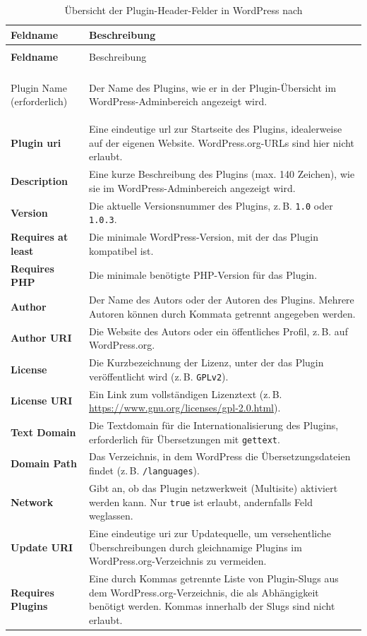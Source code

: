 \begin{longtable}{>{\bfseries}p{4cm} p{10cm}}
 \caption{Übersicht der Plugin-Header-Felder in WordPress nach \cite{wordpress2024HeaderRequirement}} \\
 \hline
 Feldname & Beschreibung \\
 \hline
 \endfirsthead

 \multicolumn{2}{l}{\textit{Fortsetzung von vorheriger Seite}} \\
 \hline
 Feldname & Beschreibung \\
 \hline
 \endhead

 \hline
 \multicolumn{2}{r}{\textit{Fortsetzung auf nächster Seite}} \\
 \endfoot

 \hline
 \endlastfoot

 Plugin Name (erforderlich) & Der Name des Plugins, wie er in der Plugin-Übersicht im WordPress-Adminbereich angezeigt wird. \\
 Plugin \gls{uri} & Eine eindeutige \gls{url} zur Startseite des Plugins, idealerweise auf der eigenen Website. WordPress.org-URLs sind hier nicht erlaubt. \\
 Description & Eine kurze Beschreibung des Plugins (max. 140 Zeichen), wie sie im WordPress-Adminbereich angezeigt wird. \\
 Version & Die aktuelle Versionsnummer des Plugins, z.\,B. \texttt{1.0} oder \texttt{1.0.3}. \\
 Requires at least & Die minimale WordPress-Version, mit der das Plugin kompatibel ist. \\
 Requires PHP & Die minimale benötigte PHP-Version für das Plugin. \\
 Author & Der Name des Autors oder der Autoren des Plugins. Mehrere Autoren können durch Kommata getrennt angegeben werden. \\
 Author URI & Die Website des Autors oder ein öffentliches Profil, z.\,B. auf WordPress.org. \\
 License & Die Kurzbezeichnung der Lizenz, unter der das Plugin veröffentlicht wird (z.\,B. \texttt{GPLv2}). \\
 License URI & Ein Link zum vollständigen Lizenztext (z.\,B. \url{https://www.gnu.org/licenses/gpl-2.0.html}). \\
 Text Domain & Die Textdomain für die Internationalisierung des Plugins, erforderlich für Übersetzungen mit \texttt{gettext}. \\
 Domain Path & Das Verzeichnis, in dem WordPress die Übersetzungsdateien findet (z.\,B. \texttt{/languages}). \\
 Network & Gibt an, ob das Plugin netzwerkweit (Multisite) aktiviert werden kann. Nur \texttt{true} ist erlaubt, andernfalls Feld weglassen. \\
 Update URI & Eine eindeutige \gls{uri} zur Updatequelle, um versehentliche Überschreibungen durch gleichnamige Plugins im WordPress.org-Verzeichnis zu vermeiden. \\
 Requires Plugins & Eine durch Kommas getrennte Liste von Plugin-Slugs aus dem WordPress.org-Verzeichnis, die als Abhängigkeit benötigt werden. Kommas innerhalb der Slugs sind nicht erlaubt. \\
\end{longtable}


